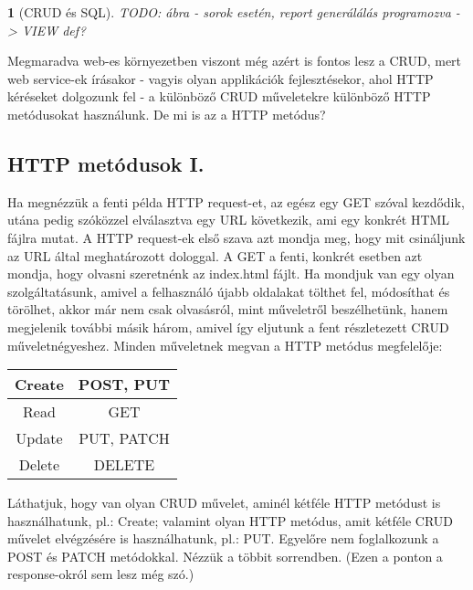 \documentclass[a4paper, 12pt, oneside]{article}
\newtheorem*{defin}{}
\begin{document}
\begin{center}
\begin{defin}[CRUD és SQL]
TODO: ábra - sorok esetén, report generálálás programozva -> VIEW def?
\end{defin}
\end{center}

Megmaradva web-es környezetben viszont még azért is fontos lesz a CRUD, mert web service-ek írásakor - vagyis olyan applikációk fejlesztésekor, ahol HTTP kéréseket dolgozunk fel - a különböző CRUD műveletekre különböző HTTP metódusokat használunk. De mi is az a HTTP metódus?

\subsection*{HTTP metódusok I.}

Ha megnézzük a fenti példa HTTP request-et, az egész egy GET szóval kezdődik, utána pedig szóközzel elválasztva egy URL következik, ami egy konkrét HTML fájlra mutat. A HTTP request-ek első szava azt mondja meg, hogy mit csináljunk az URL által meghatározott dologgal. A GET a fenti, konkrét esetben azt mondja, hogy olvasni szeretnénk az index.html fájlt.
\bigbreak
Ha mondjuk van egy olyan szolgáltatásunk, amivel a felhasználó újabb oldalakat tölthet fel, módosíthat és törölhet, akkor már nem csak olvasásról, mint műveletről beszélhetünk, hanem megjelenik további másik három, amivel így eljutunk a fent részletezett CRUD műveletnégyeshez. Minden műveletnek megvan a HTTP metódus megfelelője:

\begin{center}
\begin{tabular}{ | c | c | }
 \hline
Create & POST, PUT  \\
 \hline
Read & GET \\
 \hline
Update & PUT, PATCH \\
 \hline
Delete & DELETE  \\
 \hline
\end{tabular}
\end{center}

Láthatjuk, hogy van olyan CRUD művelet, aminél kétféle HTTP metódust is használhatunk, pl.: Create; valamint olyan HTTP metódus, amit kétféle CRUD művelet elvégzésére is használhatunk, pl.: PUT. Egyelőre nem foglalkozunk a POST és PATCH metódokkal. Nézzük a többit sorrendben. (Ezen a ponton a response-okról sem lesz még szó.)
\end{document}
